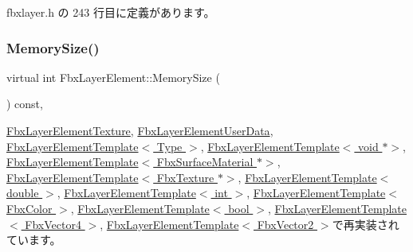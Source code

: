  fbxlayer.\+h の 243 行目に定義があります。

\mbox{\label{class_fbx_layer_element_a15654a170f2d2952bf1eafad65262b8b}} 
\subsubsection{\texorpdfstring{Memory\+Size()}{MemorySize()}}
{\footnotesize\ttfamily virtual int Fbx\+Layer\+Element\+::\+Memory\+Size (\begin{DoxyParamCaption}{ }\end{DoxyParamCaption}) const\hspace{0.3cm}{\ttfamily [inline]}, {\ttfamily [virtual]}}



\hyperlink{class_fbx_layer_element_texture_aa6ee4c7c56a71d1a3f70fa4e0806e1f5}{Fbx\+Layer\+Element\+Texture}, \hyperlink{class_fbx_layer_element_user_data_aa02fc5861dec4da68293f9660d4ff13b}{Fbx\+Layer\+Element\+User\+Data}, \hyperlink{class_fbx_layer_element_template_aa6a7b5ed38b51d4a903f9ed2e715ee79}{Fbx\+Layer\+Element\+Template$<$ Type $>$}, \hyperlink{class_fbx_layer_element_template_aa6a7b5ed38b51d4a903f9ed2e715ee79}{Fbx\+Layer\+Element\+Template$<$ void $\ast$$>$}, \hyperlink{class_fbx_layer_element_template_aa6a7b5ed38b51d4a903f9ed2e715ee79}{Fbx\+Layer\+Element\+Template$<$ Fbx\+Surface\+Material $\ast$$>$}, \hyperlink{class_fbx_layer_element_template_aa6a7b5ed38b51d4a903f9ed2e715ee79}{Fbx\+Layer\+Element\+Template$<$ Fbx\+Texture $\ast$$>$}, \hyperlink{class_fbx_layer_element_template_aa6a7b5ed38b51d4a903f9ed2e715ee79}{Fbx\+Layer\+Element\+Template$<$ double $>$}, \hyperlink{class_fbx_layer_element_template_aa6a7b5ed38b51d4a903f9ed2e715ee79}{Fbx\+Layer\+Element\+Template$<$ int $>$}, \hyperlink{class_fbx_layer_element_template_aa6a7b5ed38b51d4a903f9ed2e715ee79}{Fbx\+Layer\+Element\+Template$<$ Fbx\+Color $>$}, \hyperlink{class_fbx_layer_element_template_aa6a7b5ed38b51d4a903f9ed2e715ee79}{Fbx\+Layer\+Element\+Template$<$ bool $>$}, \hyperlink{class_fbx_layer_element_template_aa6a7b5ed38b51d4a903f9ed2e715ee79}{Fbx\+Layer\+Element\+Template$<$ Fbx\+Vector4 $>$}, \hyperlink{class_fbx_layer_element_template_aa6a7b5ed38b51d4a903f9ed2e715ee79}{Fbx\+Layer\+Element\+Template$<$ Fbx\+Vector2 $>$}で再実装されています。




